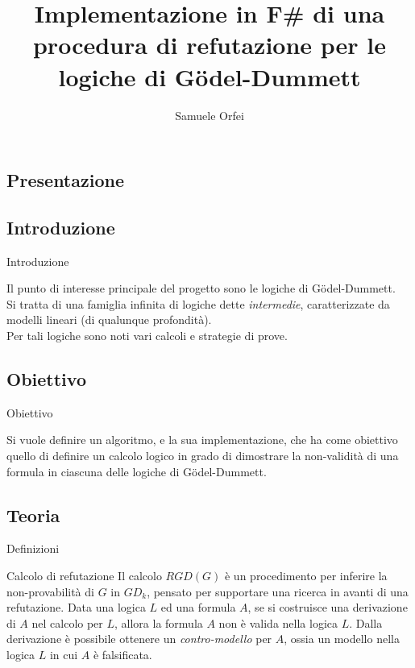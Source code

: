 \documentclass{beamer}
\title{Implementazione in F\# di una procedura di refutazione per le logiche di G\"odel-Dummett} %
\author{Samuele Orfei}
\begin{document}
\frame[c]{\maketitle}

\begin{darkframes}

    \section{Presentazione}

    \subsection{Introduzione}
    \begin{frame}{Introduzione}

        Il punto di interesse principale del progetto sono le logiche di G\"odel-Dummett. \\
        Si tratta di una famiglia infinita di logiche dette \textit{intermedie}, caratterizzate da modelli lineari (di qualunque profondità). \\
        Per tali logiche sono noti vari calcoli e strategie di prove.

    \end{frame}

    \subsection{Obiettivo}
    \begin{frame}{Obiettivo}

        Si vuole definire un algoritmo, e la sua implementazione, che ha come obiettivo quello di definire un calcolo logico in grado di dimostrare la non-validità di una formula in ciascuna delle logiche di G\"odel-Dummett.\\

    \end{frame}

    \subsection{Teoria}
    \begin{frame}{Definizioni}
        \begin{block}{Calcolo di refutazione}
            Il calcolo $RGD(G)$ è un procedimento per inferire la non-provabilità di $G$ in $GD_k$, pensato per supportare una ricerca in avanti di una refutazione.
            Data una logica $L$ ed una formula $A$, se si costruisce una derivazione di $A$ nel calcolo per $L$, allora la formula $A$ non è valida nella logica $L$.
            Dalla derivazione è possibile ottenere un \textit{contro-modello} per $A$, ossia un modello nella logica $L$ in cui $A$ è falsificata.
        \end{block}


\end{frame}
\end{darkframes}
\end{document}
